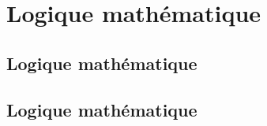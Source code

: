 \documentclass{book}
\begin{document}
\chapter{Logique mathématique}
\section{Logique mathématique} 
\lipsum[1-2]
\section{Logique mathématique} 
\lipsum[1-2]
\end{document}
